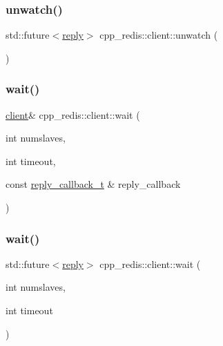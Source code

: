 \mbox{\label{classcpp__redis_1_1client_a006e1258d7857f2d83bd9be48945f79a}} 
\subsubsection{\texorpdfstring{unwatch()}{unwatch()}\hspace{0.1cm}{\footnotesize\ttfamily [2/2]}}
{\footnotesize\ttfamily std\+::future$<$\hyperlink{classcpp__redis_1_1reply}{reply}$>$ cpp\+\_\+redis\+::client\+::unwatch (\begin{DoxyParamCaption}{ }\end{DoxyParamCaption})}

\mbox{\label{classcpp__redis_1_1client_ab7e11ccc1fb07ae3dce860042b96f4d9}} 
\subsubsection{\texorpdfstring{wait()}{wait()}\hspace{0.1cm}{\footnotesize\ttfamily [1/2]}}
{\footnotesize\ttfamily \hyperlink{classcpp__redis_1_1client}{client}\& cpp\+\_\+redis\+::client\+::wait (\begin{DoxyParamCaption}\item[{int}]{numslaves,  }\item[{int}]{timeout,  }\item[{const \hyperlink{classcpp__redis_1_1client_a061a1140d36d2eaeda82b09a0bb3f9f2}{reply\+\_\+callback\+\_\+t} \&}]{reply\+\_\+callback }\end{DoxyParamCaption})}

\mbox{\label{classcpp__redis_1_1client_a4ef6f516a3dcdea1b317bb4e5e96e680}} 
\subsubsection{\texorpdfstring{wait()}{wait()}\hspace{0.1cm}{\footnotesize\ttfamily [2/2]}}
{\footnotesize\ttfamily std\+::future$<$\hyperlink{classcpp__redis_1_1reply}{reply}$>$ cpp\+\_\+redis\+::client\+::wait (\begin{DoxyParamCaption}\item[{int}]{numslaves,  }\item[{int}]{timeout }\end{DoxyParamCaption})}


